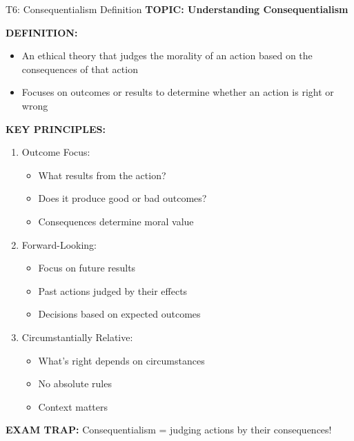 \documentclass[8pt]{beamer}
\begin{document}
	\begin{frame}{T6: Consequentialism Definition}
		\fontsize{6.5}{7.5}\selectfont
		\textbf{TOPIC: Understanding Consequentialism}
		
		\vspace{0.1cm}
		\textbf{DEFINITION:}
		\begin{itemize}
			\item An ethical theory that judges the morality of an action based on the consequences of that action
			\item Focuses on outcomes or results to determine whether an action is right or wrong
		\end{itemize}
		
		\vspace{0.1cm}
		\textbf{KEY PRINCIPLES:}
		\begin{enumerate}
			\item \textcolor{myblue}{Outcome Focus:}
			\begin{itemize}
				\item What results from the action?
				\item Does it produce good or bad outcomes?
				\item Consequences determine moral value
			\end{itemize}
			\item \textcolor{myblue}{Forward-Looking:}
			\begin{itemize}
				\item Focus on future results
				\item Past actions judged by their effects
				\item Decisions based on expected outcomes
			\end{itemize}
			\item \textcolor{myblue}{Circumstantially Relative:}
			\begin{itemize}
				\item What's right depends on circumstances
				\item No absolute rules
				\item Context matters
			\end{itemize}
		\end{enumerate}
		
		\textcolor{myred}{\textbf{EXAM TRAP:}} Consequentialism = \textcolor{myblue}{judging actions by their consequences}!
	\end{frame}
	
\end{document}
